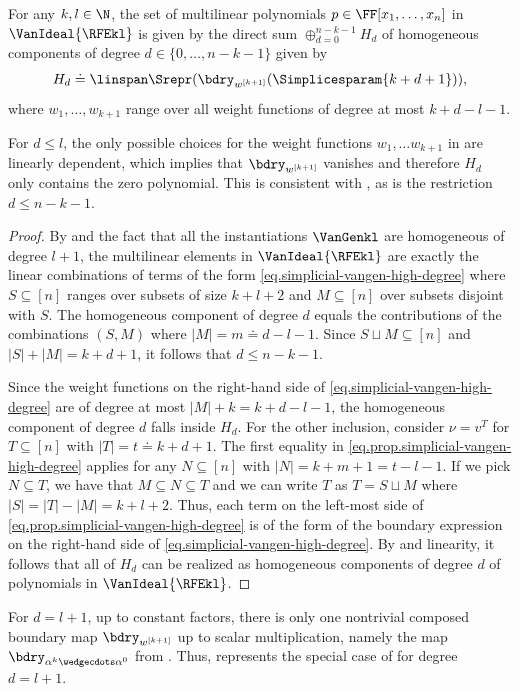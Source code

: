 \begin{corollary}
  \label{cor.simplicial-vangen-high-degree}
  For any \(k,l \in \N\), the set of multilinear polynomials $p \in \FF[x_1,\dots,x_n]$ in \(\VanIdeal{\RFEkl}\) is given by the direct sum $\oplus_{d=0}^{n-k-1} H_d$ of homogeneous components of degree $d \in \{0,\dots,n-k-1\}$ given by 
  \begin{equation}\label{eq.cor.simplicial-vangen-high-degree}
  H_d \doteq \linspan \Srepr (\bdry_{w^{[k+1]}}(\Simplicesparam{k+d+1})), 
  \end{equation}
  where $w_1, \dots, w_{k+1}$ range over all weight functions of degree at most $k+d-l-1$.
\end{corollary}
For $d \le l$, the only possible choices for the weight functions $w_1, \dots w_{k+1}$ in  are linearly dependent, which implies that $\bdry_{w^{[k+1]}}$ vanishes and therefore $H_d$ only contains the zero polynomial. This is consistent with , as is the restriction $d \le n-k-1$.
\begin{proof}
By  and the fact that all the instantiations $\VanGenkl$ are homogeneous of degree $l+1$, the multilinear elements in \(\VanIdeal{\RFEkl}\) are exactly the linear combinations of terms of the form \eqref{eq.simplicial-vangen-high-degree} where $S \subseteq [n]$ ranges over subsets of size $k+l+2$ and $M \subseteq [n]$ over subsets disjoint with $S$. The homogeneous component of degree $d$ equals the contributions of the combinations $(S,M)$ where $|M|=m \doteq d-l-1$. Since $S \sqcup M \subseteq [n]$ and $|S|+|M|=k+d+1$, it follows that $d \le n-k-1$.

Since the weight functions on the right-hand side of \eqref{eq.simplicial-vangen-high-degree} are of degree at most $|M|+k=k+d-l-1$, the homogeneous component of degree $d$ falls inside $H_d$. For the other inclusion, consider $\nu=v^T$ for $T \subseteq [n]$ with $|T|=t \doteq k+d+1$. The first equality in \eqref{eq.prop.simplicial-vangen-high-degree} applies for any $N \subseteq [n]$ with $|N|=k+m+1=t-l-1$. If we pick $N \subseteq T$, we have that $M \subseteq N \subseteq T$ and we can write $T$ as $T = S \sqcup M$ where $|S| = |T|-|M| = k+l+2$. Thus, each term on the left-most side of \eqref{eq.prop.simplicial-vangen-high-degree} is of the form of the boundary expression on the right-hand side of 
\eqref{eq.simplicial-vangen-high-degree}. By  and linearity, it follows that all of $H_d$ can be realized as homogeneous components of degree $d$ of polynomials in $\VanIdeal{\RFEkl}$.
\end{proof}
For $d=l+1$, up to constant factors, there is only one nontrivial composed boundary map $\bdry_{w^{[k+1]}}$ up to scalar multiplication, namely the map $\bdry_{\alpha^k\wedgecdots\alpha^0}$ from . Thus,  represents the special case of  for degree $d=l+1$. 

